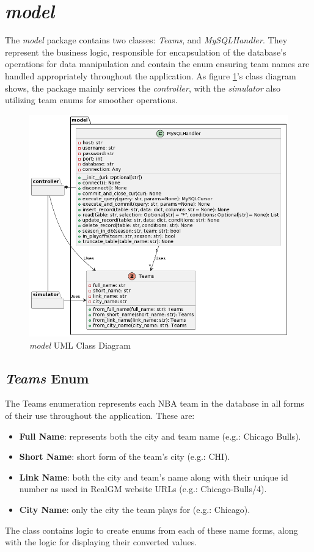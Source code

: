 \documentclass{thesis-ekf}
\theoremstyle{definition}
\theoremstyle{remark}
\begin{document}
\section{\emph{model}}
The \emph{model} package contains two classes: \emph{Teams}, and \emph{MySQLHandler}. They represent the business logic, responsible for encapsulation of the database's operations for data manipulation and contain the enum ensuring team names are handled appropriately throughout the application. As figure \ref{img-model-class}'s class diagram shows, the package mainly services the \emph{controller}, with the \emph{simulator} also utilizing team enums for smoother operations.
\begin{figure}[th!]
	\centering
	\includegraphics[width=0.8\linewidth]{img/class/model}
	\caption{\emph{model} UML Class Diagram}
	\label{img-model-class}
\end{figure}

\subsection{\emph{Teams} Enum}
The Teams enumeration represents each NBA team in the database in all forms of their use throughout the application. These are:
\begin{itemize}
	\item \textbf{Full Name}: represents both the city and team name (e.g.: Chicago Bulls).
	\item \textbf{Short Name}: short form of the team's city (e.g.: CHI).
	\item \textbf{Link Name}: both the city and team's name along with their unique id number as used in RealGM website URLs (e.g.: Chicago-Bulls/4).
	\item \textbf{City Name}: only the city the team plays for (e.g.: Chicago).
\end{itemize} 
The class contains logic to create enums from each of these name forms, along with the logic for displaying their converted values.
\end{document}
